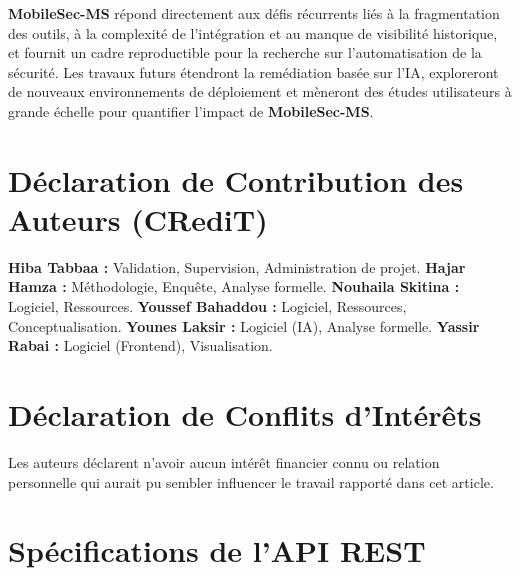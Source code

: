 \documentclass[
  journal=largetwo,
  manuscript=article-type,
  year=2025,
  volume=1,
]{cup-journal}
\begin{document}
\textbf{MobileSec-MS} répond directement aux défis récurrents liés à la fragmentation des outils, à la complexité de l'intégration et au manque de visibilité historique, et fournit un cadre reproductible pour la recherche sur l'automatisation de la sécurité. Les travaux futurs étendront la remédiation basée sur l'IA, exploreront de nouveaux environnements de déploiement et mèneront des études utilisateurs à grande échelle pour quantifier l'impact de \textbf{MobileSec-MS}.

\section*{Déclaration de Contribution des Auteurs (CRediT)}
\textbf{Hiba Tabbaa :} Validation, Supervision, Administration de projet.
\textbf{Hajar Hamza :} Méthodologie, Enquête, Analyse formelle.
\textbf{Nouhaila Skitina :} Logiciel, Ressources.
\textbf{Youssef Bahaddou :} Logiciel, Ressources, Conceptualisation.
\textbf{Younes Laksir :} Logiciel (IA), Analyse formelle.
\textbf{Yassir Rabai :} Logiciel (Frontend), Visualisation.

\section*{Déclaration de Conflits d'Intérêts}
Les auteurs déclarent n'avoir aucun intérêt financier connu ou relation personnelle qui aurait pu sembler influencer le travail rapporté dans cet article.



\onecolumn
\appendix

\section{Spécifications de l'API REST}
\label{app-api}
\end{document}
